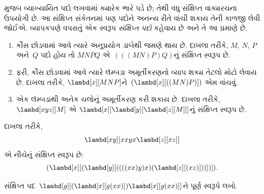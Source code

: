 \documentclass[../../../include/open-logic-section]{subfiles}
\begin{document}

 મુજબ વ્યાખ્યાયિત પદો લખવામાં ક્યારેક
ભારે પડે છે; તેથી વધુ સંક્ષિપ્ત વાક્યરચના ઉપયોગી છે. આ
સંક્ષિપ્ત સંકેતનમાં પણ પદોને અનન્ય રીતે વાંચી શકાય તેની
કાળજી લેવી જોઈએ. વ્યાપકપણે વપરાતું એક સ્વરૂપ
\emph{સંક્ષિપ્ત પદો} કહેવાય છે અને તે આ પ્રમાણે છે.

\begin{enumerate}
\item કૌંસ છોડવામાં આવે ત્યારે અનુપ્રયોગ ડાબેથી જમણે થાય છે.
  દાખલા તરીકે, $M$, $N$, $P$ અને~$Q$ પદો હોય તો
  $MNPQ$ એ~$(((MN)P)Q)$નું સંક્ષિપ્ત સ્વરૂપ છે.
\item ફરી, કૌંસ છોડવામાં આવે ત્યારે લૅમ્બડા અમૂર્તીકરણનો
  વ્યાપ શક્ય તેટલો મોટો લેવાય છે. દાખલા તરીકે,
  $\lambd[x][MNP]$ને~$(\lambd[x][((MN)P)])$ એમ વાંચવું.
\item એક લૅમ્બડાથી અનેક ચલોનું અમૂર્તીકરણ કરી શકાય છે.
  દાખલા તરીકે, $\lambd[xyz][M]$ એ
  $\lambd[x][\lambd[y][\lambd[z][M]]]$નું સંક્ષિપ્ત સ્વરૂપ છે.
\end{enumerate}

દાખલા તરીકે,
\[
\lambd[xy][xxyx \lambd[z][xz]]
\]
એ નીચેનું સંક્ષિપ્ત સ્વરૂપ છે:
\[
(\lambd[x][(\lambd[y][((((xx)y)x)(\lambd[z][(xz)]))])]).
\]

\begin{prob}
સંક્ષિપ્ત પદ~$\lambd[g][(\lambd[x][g (x x)])
  \lambd[x][g (x x)]]$ને પૂર્ણ સ્વરૂપે લખો.
\end{prob}
\end{document}
